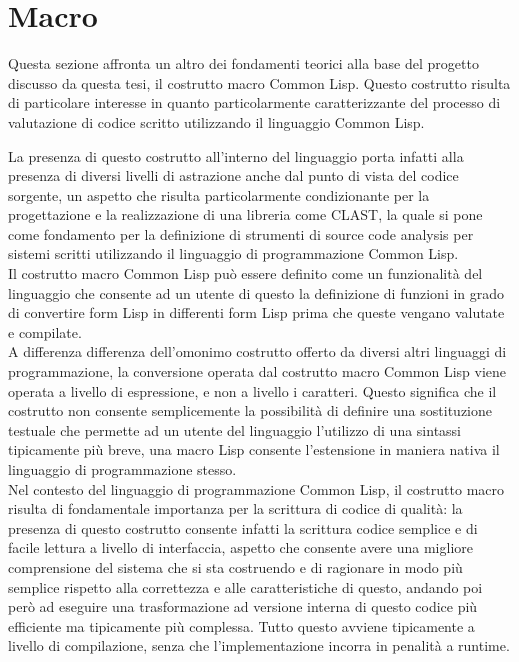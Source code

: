 \section{Macro}

Questa sezione affronta un altro dei fondamenti teorici alla base del progetto
discusso da questa tesi, il costrutto macro Common Lisp. Questo costrutto
risulta di particolare interesse in quanto particolarmente caratterizzante del
processo di valutazione di codice scritto utilizzando il linguaggio Common Lisp.

La presenza di questo costrutto all'interno del linguaggio porta infatti alla
presenza di diversi livelli di astrazione anche dal punto di vista del codice
sorgente, un aspetto che risulta particolarmente condizionante per la
progettazione e la realizzazione di una libreria come CLAST, la quale si pone
come fondamento per la definizione di strumenti di source code analysis per
sistemi scritti utilizzando il linguaggio di programmazione Common Lisp.\\

Il costrutto macro Common Lisp può essere definito come un funzionalità del
linguaggio che consente ad un utente di questo la definizione di funzioni in
grado di convertire form Lisp in differenti form Lisp prima che queste vengano
valutate e compilate.\\

A differenza differenza dell'omonimo costrutto offerto da diversi altri
linguaggi di programmazione, la conversione operata dal costrutto macro Common
Lisp viene operata a livello di espressione, e non a livello i caratteri. Questo
significa che il costrutto non consente semplicemente la possibilità di definire
una sostituzione testuale che permette ad un utente del linguaggio l’utilizzo di
una sintassi tipicamente più breve, una macro Lisp consente l'estensione in
maniera nativa il linguaggio di programmazione stesso.\\

Nel contesto del linguaggio di programmazione Common Lisp, il costrutto macro
risulta di fondamentale importanza per la scrittura di codice di qualità: la
presenza di questo costrutto consente infatti la scrittura codice semplice e di
facile lettura a livello di interfaccia, aspetto che consente avere una migliore
comprensione del sistema che si sta costruendo e di ragionare in modo più
semplice rispetto alla correttezza e alle caratteristiche di questo, andando poi
però ad eseguire una trasformazione ad versione interna di questo codice più
efficiente ma tipicamente più complessa. Tutto questo avviene tipicamente a
livello di compilazione, senza che l'implementazione incorra in penalità a
runtime.\\

